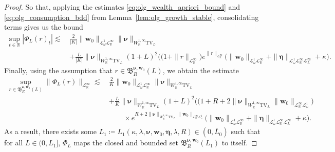 \documentclass[11pt,oneside,english,reqno,dvipsnames,table]{amsart}
\numberwithin{equation}{section}
\theoremstyle{plain}
\theoremstyle{definition}
\theoremstyle{remark}
\theoremstyle{plain}
\theoremstyle{plain}
\theoremstyle{plain}
\theoremstyle{plain}
\theoremstyle{plain}
\theoremstyle{plain}
\theoremstyle{plain}
\newcommand{\TV}{\text{TV}}
\newcommand{\bw}{\mathbf{w}}
\newcommand{\fB}{\mathfrak{B}}
\newcommand{\mbR}{\mathbb{R}}
\newcommand{\mfB}{\mathfrak{B}}
\newcommand{\msL}{\mathscr{L}}
\newcommand{\bmeta}{\boldsymbol{\eta}}
\newcommand{\bnu}{\boldsymbol{\nu}}
\numberwithin{thm}{section}
\begin{document}
\begin{proof}
So that, applying the estimates \eqref{eq:olg_wealth_apriori_bound} and \eqref{eq:olg_consumption_bdd} from Lemma~\ref{lem:olg_growth_stable}, consolidating terms gives us the bound
%
\begin{equation*}
	\begin{aligned}
		\sup_{t\in \mbR}|\Phi_L(r)_t| \lesssim \, & \frac{2}{|K|}\|\bw_0\|_{\msL^1_\omega \msL^\infty_\mbR}\|\bnu\|_{W^{1,\infty}_{\mbR}\TV_L} \\
		& + \frac{L}{|K|} \|\bnu\|_{W^{1,\infty}_{\mbR}\TV_L}  (1+L)^2\Big( \big(1+\|r\|_{\msL^\infty_\mbR}\big) e^{\|r\|_{\msL^\infty_{\mbR}}} \big(\|\bw_0\|_{\msL^1_\omega \msL^\infty_\mbR } +    \|\bmeta\|_{ \msL^1_\omega \msL^\infty_{\mbR} \msL^\infty_{L}} + \kappa \Big).
	\end{aligned}
\end{equation*}
%
Finally, using the assumption that $r\in \mfB^{\bnu,\bw_0}_R(L)$, we obtain the estimate
%
\begin{equation*}
	\begin{aligned}
		\sup_{r\in \mfB^{\bnu,\bw_0}_R(L) }\|\Phi_L(r)\|_{\msL^\infty_{\mbR}} \lesssim \, & \frac{2}{K}\|\bw_0\|_{\msL^1_\omega \msL^\infty_\mbR}\|\bnu\|_{W^{1,\infty}_{\mbR}\TV_L} \\
		& + \frac{L}{K} \|\bnu\|_{W^{1,\infty}_{\mbR}\TV_L}  (1+L)^2\Big( \big(1+R+2\|\bnu\|_{W^{1,\infty}_{\mbR}\TV_L} \|\bw_0\|_{\msL^\infty_\mbR \msL^1_\omega} \big) \\
        &\qquad \times e^{R+2\|\bnu\|_{W^{1,\infty}_{\mbR}\TV_L} \|\bw_0\|_{\msL^\infty_\mbR \msL^1_\omega} } \big(\|\bw_0\|_{\msL^1_\omega \msL^\infty_\mbR } +    \|\bmeta\|_{ \msL^1_\omega \msL^\infty_{\mbR} \msL^\infty_{L}} + \kappa \Big).
	\end{aligned}
\end{equation*}
%
 As a result, there exists some $L_1\coloneqq L_1(\kappa,\lambda,\bnu, \bw_0,\bmeta,\lambda,R) \in (0,\bar{L}_0)$ such that for all $L \in (0,L_1]$, $\Phi_L$  maps the closed and bounded set $ \fB^{\bnu,\bw_0}_R(L_1)$ to itself.


\end{proof}
\end{document}
